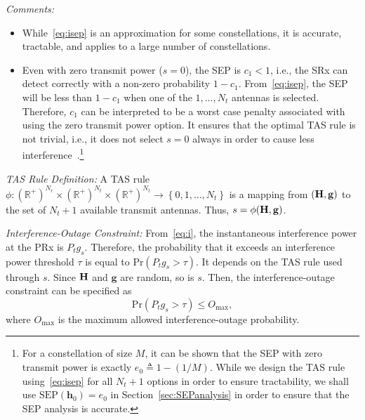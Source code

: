 \documentclass[12pt,draftcls,peerreview,onecolumn]{IEEEtran}
\newcommand{\brac}[1]{\left({#1}\right)}
\newcommand{\define}{\triangleq}
\newcommand{\ie}{{i.e.}}
\newcommand{\mtx}[1]{{\bf #1}} %
\newcommand{\prob}[1]{\text{Pr}\brac{#1}}
\newcommand{\SEP}{\text{SEP}}
\newcommand{\nx}{{0}}
\newcommand{\Nt}{{N_t}}
\newcommand{\Nr}{{N_r}}
\newcommand{\Pt}{{P_t}}
\newcommand{\such}{h}
\newcommand{\puch}{g}
\newcommand{\hk}[1]{{\such_{#1}}}
\newcommand{\gk}[1]{{\puch_{#1}}}
\newcommand{\h}{\mathbf{\such}}
\newcommand{\g}{\mathbf{\puch}}
\newcommand{\outmax}{O_{\text{max}}}
\newcommand{\itau}{\tau}
\newcommand{\cone}{c_{1}}
\newcommand{\allopts}{\left\{\nx,1,\ldots,\Nt\right\}}
\newcommand{\asrule}{\phi}
\newcommand{\zerosep}{e_0}
\newcommand{\Hmx}{\mtx{H}}
\begin{document}
{\em Comments:}
\begin{itemize}
\item While~\eqref{eq:isep} is an approximation for some constellations,  it is accurate, tractable, and applies to a large number of constellations. %
\item Even with zero transmit power ($s=\nx$), the SEP is $\cone<1$, \ie, the SRx can detect correctly with a non-zero probability $1-\cone$. From~\eqref{eq:isep}, the SEP will be less than $1-\cone$ when one of the $1,\ldots,\Nt$ antennas is selected. Therefore, $\cone$ can be interpreted to be a worst case penalty associated with using the zero transmit power option. It ensures that the optimal TAS rule is not trivial, \ie, it does not select $s=\nx$  always in order to cause less interference~\cite{Kashyap_2014_TCOM,Sarvendranath_2013_TCOM,Sarvendranath_2014_TCOM}.\footnote{For a constellation of size $M$, it can be shown that the SEP with zero transmit power is exactly $\zerosep\define 1-\left(1/M\right)$. While we design the TAS rule using~\eqref{eq:isep} for all $\Nt+1$ options in order to ensure tractability, we shall use $\SEP(\h_0) = \zerosep$ in Section~\ref{sec:SEPanalysis} in order to ensure that the SEP analysis is accurate.  } 	
\end{itemize}


{\em TAS Rule Definition:} A TAS rule $\asrule:\brac{\mathbb{R}^{+}}^{\Nr}\times\brac{\mathbb{R}^{+}}^{\Nt} \times \brac{\mathbb{R}^{+}}^{\Nt} \rightarrow \allopts$ is a mapping from $\left(\Hmx,\g\right)$ to the set of $\Nt+1$ available transmit antennas. Thus, $s = \phi(\Hmx,\g)$.

{\em Interference-Outage Constraint:}
From~\eqref{eq:i}, the instantaneous interference power at the PRx is $\Pt\gk{s}$. Therefore, the probability that it exceeds an interference power threshold $\itau$ is equal to $\prob{\Pt\gk{s}>\itau}$. It depends on the TAS rule used through $s$. Since $\Hmx$ and $\g$ are random, so is $s$. Then, the interference-outage constraint can be specified as 
\begin{equation}
\prob{\Pt\gk{s}>\itau} \leq \outmax,
\label{eq:iop_cons}
\end{equation}
where $\outmax$ is the maximum allowed interference-outage probability. 
\end{document}
